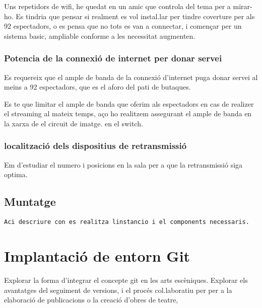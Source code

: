\documentclass[
  10pt, krantz2,
]{krantz}
\begin{document}
Uns repetidors de wifi, he quedat en un amic que controla del tema per a mirar-ho. Es tindria que pensar si realment es vol instal.lar per tindre coverture per als 92 espectadors, o es pensa que no tots es van a connectar, i començar per un sistema basic, ampliable conforme a les necessitat augmenten.

\hypertarget{potencia-de-la-connexiuxf3-de-internet-per-donar-servei}{%
\subsection{Potencia de la connexió de internet per donar servei}\label{potencia-de-la-connexiuxf3-de-internet-per-donar-servei}}

Es requereix que el ample de banda de la connexió d'internet puga donar servei al meins a 92 espectadors, que es el aforo del pati de butaques.

Es te que limitar el ample de banda que oferim als espectadors en cas de realizer el streaming al mateix temps, aço ho realitzem assegurant el ample de banda en la xarxa de el circuit de imatge. en el switch.

\hypertarget{localitzaciuxf3-dels-dispositius-de-retransmissiuxf3}{%
\subsection{localització dels dispositius de retransmissió}\label{localitzaciuxf3-dels-dispositius-de-retransmissiuxf3}}

Em d'estudiar el numero i posicions en la sala per a que la retransmissió siga optima.

\hypertarget{muntatge-1}{%
\section{Muntatge}\label{muntatge-1}}

\texttt{Aci\ descriure\ con\ es\ realitza\ l\textquotesingle{}instancio\ i\ el\ components\ necessaris.}

\hypertarget{implantaciuxf3-de-entorn-git}{%
\chapter{Implantació de entorn Git}\label{implantaciuxf3-de-entorn-git}}

Explorar la forma d'integrar el concepte git en les arts escèniques. Explorar els avantatges del seguiment de versions, i el procés col.laboratiu per per a la elaboració de publicacions o la creació d'obres de teatre,
\end{document}
